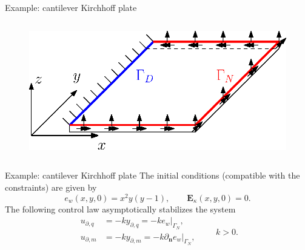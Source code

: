 \documentclass[aspectratio=169]{ISAE-Beamer}
\begin{document}
\begin{frame}{Example: cantilever Kirchhoff plate}
\begin{columns}
	\begin{column}{.5\textwidth}
		\begin{figure}[b]
			\centering
			\includegraphics[width=0.9\columnwidth]{part_3/applications/bs_Kirchh/plate_controlled.eps}
		\end{figure}
	\end{column}
\end{columns}

\end{frame}

\begin{frame}{Example: cantilever Kirchhoff plate}
The initial conditions (compatible with the constraints) are given by
\[
e_w(x,y,0) = x^2 y (y-1), \qquad \bm{E}_\kappa(x,y,0) ={0}.
\]
The following control law asymptotically stabilizes the system
\begin{equation*}
\begin{aligned}
u_{\partial, q} & = - k y_{\partial, q} = - k e_w|_{\Gamma_N}, \\
u_{\partial, m} & = - k y_{\partial, m} = - k \partial_{\bm{n}} e_w|_{\Gamma_N}, \\
\end{aligned} \qquad k>0.
\end{equation*}

\end{frame}
\end{document}

